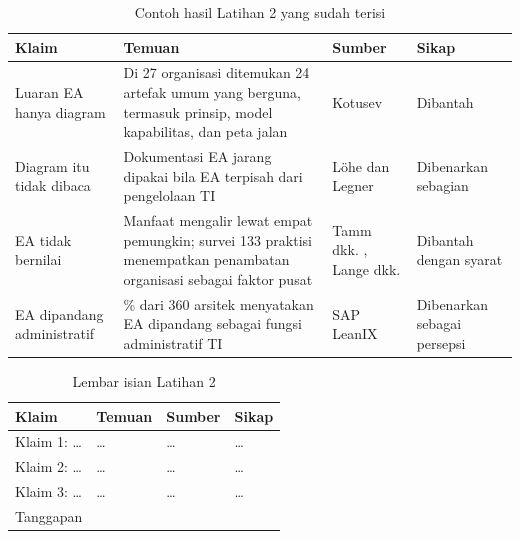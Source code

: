 \begin{table}[!htb]
  \centering
  \caption{Contoh hasil Latihan 2 yang sudah terisi}
  \label{tab:ch01-lat2-contoh}
  \footnotesize
  \begin{tabularx}{\textwidth}{>{\raggedright\arraybackslash}p{2.3cm}
      >{\raggedright\arraybackslash}X >{\raggedright\arraybackslash}p{2.3cm}
      >{\raggedright\arraybackslash}p{1.9cm}}
    \hline
    \textbf{Klaim} & \textbf{Temuan} & \textbf{Sumber} & \textbf{Sikap} \\
    \hline
    Luaran EA hanya diagram & Di 27 organisasi ditemukan 24 artefak umum yang berguna, termasuk prinsip, model kapabilitas, dan peta jalan & Kotusev \cite{kotusev2019,kotusev2021} & Dibantah \\
    \hline
    Diagram itu tidak dibaca & Dokumentasi EA jarang dipakai bila EA terpisah dari pengelolaan TI & Löhe dan Legner \cite{c01-lohe2014} & Dibenarkan sebagian \\
    \hline
    EA tidak bernilai & Manfaat mengalir lewat empat pemungkin; survei 133 praktisi menempatkan penambatan organisasi sebagai faktor pusat & Tamm dkk. \cite{tamm2011}, Lange dkk. \cite{lange2016} & Dibantah dengan syarat \\
    \hline
    EA dipandang administratif & 92\% dari 360 arsitek menyatakan EA dipandang sebagai fungsi administratif TI & SAP LeanIX \cite{leanix2025} & Dibenarkan sebagai persepsi \\
    \hline
  \end{tabularx}
\end{table}

\begin{table}[!htb]
  \centering
  \caption{Lembar isian Latihan 2}
  \label{tab:ch01-lat2-hasil}
  \footnotesize
  \begin{tabularx}{\textwidth}{>{\raggedright\arraybackslash}p{2.3cm}
      >{\raggedright\arraybackslash}X >{\raggedright\arraybackslash}p{2.3cm}
      >{\raggedright\arraybackslash}p{1.9cm}}
    \hline
    \textbf{Klaim} & \textbf{Temuan} & \textbf{Sumber} & \textbf{Sikap} \\
    \hline
    Klaim 1: \dots & \dots & \dots & \dots \\
    \hline
    Klaim 2: \dots & \dots & \dots & \dots \\
    \hline
    Klaim 3: \dots & \dots & \dots & \dots \\
    \hline
    Tanggapan & \multicolumn{3}{l}{\dots} \\
    \hline
  \end{tabularx}
\end{table}

